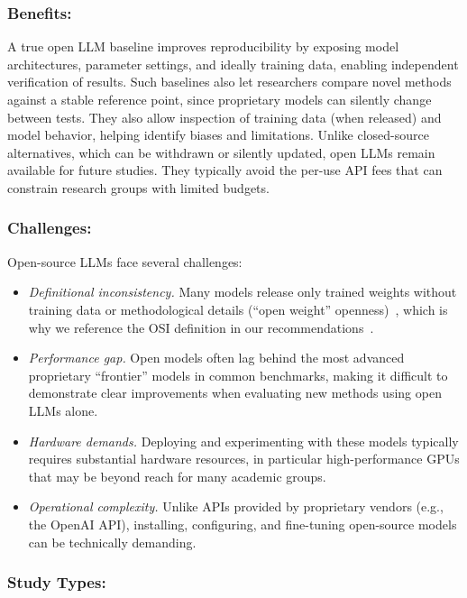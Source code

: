 \documentclass[smallextended]{svjour3}
\newcommand{\guidelinesubsubsection}[1]{\subsubsection{\bfseries #1:}}
\newcommand{\guidelinesubsubsection}[1]{\subsubsection{#1}}
\begin{document}
\guidelinesubsubsection{Benefits}

A true open LLM baseline improves reproducibility by exposing model architectures, parameter settings, and ideally training data, enabling independent verification of results.
Such baselines also let researchers compare novel methods against a stable reference point, since proprietary models can silently change between tests.
They also allow inspection of training data (when released) and model behavior, helping identify biases and limitations.
Unlike closed-source alternatives, which can be withdrawn or silently updated, open LLMs remain available for future studies.
They typically avoid the per-use API fees that can constrain research groups with limited budgets.

\guidelinesubsubsection{Challenges}

Open-source LLMs face several challenges:
\begin{itemize}
    \item \emph{Definitional inconsistency.} Many models release only trained weights without training data or methodological details (``open weight'' openness)~\cite{Gibney2024}, which is why we reference the OSI definition in our recommendations~\cite{OSIAI2024}.
    \item \emph{Performance gap.} Open models often lag behind the most advanced proprietary ``frontier'' models in common benchmarks, making it difficult to demonstrate clear improvements when evaluating new methods using open LLMs alone.
    \item \emph{Hardware demands.} Deploying and experimenting with these models typically requires substantial hardware resources, in particular high-performance GPUs that may be beyond reach for many academic groups.
    \item \emph{Operational complexity.} Unlike APIs provided by proprietary vendors (e.g., the OpenAI API), installing, configuring, and fine-tuning open-source models can be technically demanding.
\end{itemize}

\guidelinesubsubsection{Study Types}
\end{document}
